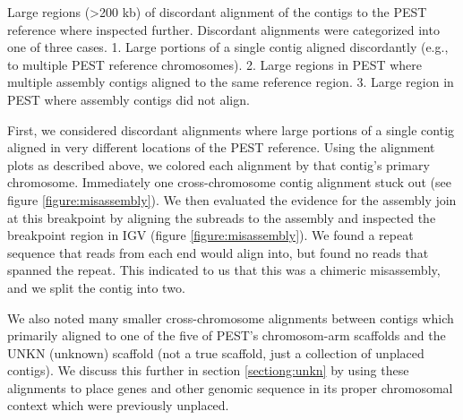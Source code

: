\par{
Large regions (>200 kb) of discordant alignment of the contigs to the PEST reference where inspected further. Discordant alignments were categorized into one of three cases. 1. Large portions of a single contig aligned discordantly (e.g., to multiple PEST reference chromosomes). 2. Large regions in PEST where multiple assembly contigs aligned to the same reference region.  3. Large region in PEST where assembly contigs did not align. 
}
\par{
First, we considered discordant alignments where large portions of a single contig aligned in very different locations of the PEST reference. Using the alignment plots as described above, we colored each alignment by that contig's primary chromosome. Immediately one cross-chromosome contig alignment stuck out (see figure \ref{figure:misassembly}). We then evaluated the evidence for the assembly join at this breakpoint by aligning the subreads to the assembly and inspected the breakpoint region in IGV (figure \ref{figure:misassembly}). We found a repeat sequence that reads from each end would align into, but found no reads that spanned the repeat. This indicated to us that this was a chimeric misassembly, and we split the contig into two.
}
\par{
We also noted many smaller cross-chromosome alignments between contigs which primarily aligned to one of the five of PEST's chromosom-arm scaffolds and the UNKN (unknown) scaffold (not a true scaffold, just a collection of unplaced contigs). We discuss this further in section \ref{sectiong:unkn} by using these alignments to place genes and other genomic sequence in its proper chromosomal context which were previously unplaced.
}

